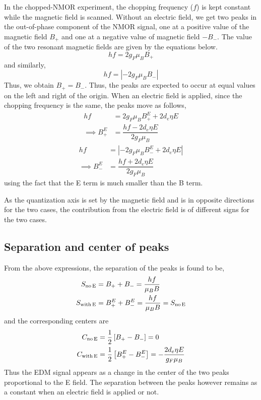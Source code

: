 In the chopped-NMOR experiment, the chopping frequency ($f$) is kept constant while the magnetic field is scanned. Without an electric field, we get two peaks in the out-of-phase component of the NMOR signal, one at a positive value of the magnetic field $B_+$ and one at a negative value of magnetic field $-B_-$. The value of the two resonant magnetic fields are given by the equations below.
\begin{equation}
hf=2g_F\mu_BB_+
\end{equation}
and similarly,
\begin{equation}
hf=|-2g_F\mu_BB_-|
\end{equation}
Thus, we obtain $B_+=B_-$. Thus, the peaks are expected to occur at equal values on the left and right of the origin. When an electric field is applied, since the chopping frequency is the same, the peaks move as follows,
\begin{equation*}
\begin{aligned}
hf &= 2g_F \mu_B B_+^E + 2d_e \eta E  \\
\implies B_+^E &= \dfrac{hf - 2d_e \eta E}{2g_F \mu_B} 
\end{aligned}
\end{equation*}
\begin{equation*}
\begin{aligned}
hf &= \left| -2g_F \mu_B B_-^E + 2d_e \eta E \right| \\
\implies B_-^E &= \dfrac{hf + 2d_e \eta E}{2g_F \mu_B}
\end{aligned}
\end{equation*}
using the fact that the E term is much smaller than the B term. 

As the quantization axis is set by the magnetic field and is in opposite directions for the two cases, the contribution from the electric field is of different signs for the two cases.

\subsection{Separation and center of peaks}

From the above expressions, the separation of the peaks is found to be,
\begin{equation}
\begin{aligned}
S_{\rm no \, E} &= B_+ + B_- = \frac{hf}{\mu_B B} \\
S_{\rm with \, E} &= B_+^E + B_-^E = \frac{hf}{\mu_B B} = S_{\rm no \, E}
\end{aligned}
\end{equation}
and the corresponding centers are 
\begin{equation*}
\begin{aligned}
C_{\rm no \, E} &= \dfrac{1}{2} \left[B_+ - B_-\right] = 0  \\
C_{\rm with \, E} &= \dfrac{1}{2} \left[ B_+^E - B_-^E \right] = - \dfrac{2d_e\eta E}{g_F \mu_B}
\end{aligned}
\end{equation*}
Thus the EDM signal appears as a change in the center of the two peaks proportional to the E field. The separation between the peaks however remains as a constant when an electric field is applied or not.

